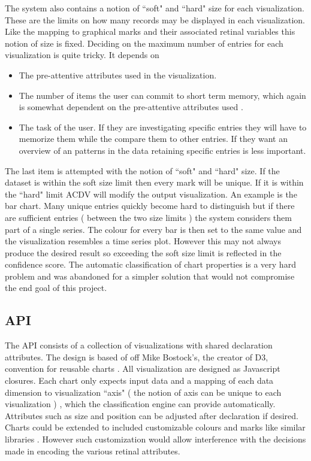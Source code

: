 \documentclass[a4paper, 11pt, titlepage, onehalfspacing]{report}
\begin{document}
The system also contains a notion of ``soft" and ``hard" size for each visualization. These are the limits on how many records may be displayed in each visualization. Like the mapping to graphical marks and their associated retinal variables this notion of size is fixed. Deciding on the maximum number of entries for each visualization is quite tricky. It depends on 
\begin{itemize}
  \item The pre-attentive attributes used in the visualization. 
  \item The number of items the user can commit to short term memory, which again is somewhat dependent on the pre-attentive attributes used \cite{Mil56}.
  \item The task of the user. If they are investigating specific entries they will have to memorize them while the compare them to other entries. If they want an overview of an patterns in the data retaining specific entries is less important. 
\end{itemize}
The last item is attempted with the notion of ``soft" and ``hard" size. If the dataset is within the soft size limit then every mark will be unique. If it is within the ``hard" limit AC\lightning{}DV will modify the output visualization. An example is the bar chart. Many unique entries quickly become hard to distinguish but if there are sufficient entries ( between the two size limits ) the system considers them part of a single series. The colour for every bar is then set to the same value and the visualization resembles a time series plot. However this may not always produce the desired result so exceeding the soft size limit is reflected in the confidence score. The automatic classification of chart properties is a very hard problem and was abandoned for a simpler solution that would not compromise the end goal of this project. 


\subsection{API}
The API consists of a collection of visualizations with shared declaration attributes. The design is based of off Mike Bostock's, the creator of D3, convention for reusable charts \cite{mikeconvention}. All visualization are designed as Javascript closures. Each chart only expects input data and a mapping of each data dimension to visualization ``axis" ( the notion of axis can be unique to each visualization ) , which the classification engine can provide automatically. Attributes such as size and position can be adjusted after declaration if desired. Charts could be extended to included customizable colours and marks like similar libraries \cite{dcjs}. However such customization would allow interference with the decisions made in encoding the various retinal attributes.  
\end{document}
